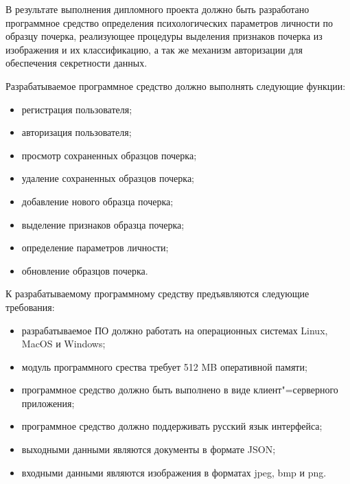 В результате выполнения дипломного проекта должно быть разработано программное средство определения психологических параметров личности по образцу почерка, реализующее процедуры выделения признаков почерка из изображения и их классификацию, а так же механизм авторизации для обеспечения секретности данных.

Разрабатываемое программное средство должно выполнять следующие функции:
\begin{itemize}
  \item регистрация пользователя;
  \item авторизация пользователя;
  \item просмотр сохраненных образцов почерка;
  \item удаление сохраненных образцов почерка;
  \item добавление нового образца почерка;
  \item выделение признаков образца почерка;
  \item определение параметров личности;
  \item обновление образцов почерка.
\end{itemize}

К разрабатываемому программному средству предъявляются следующие требования:
\begin{itemize}
  \item разрабатываемое ПО должно работать на операционных системах Linux, MacOS и Windows;
  \item модуль программного срества требует 512 MB оперативной памяти;
  \item программное средство должно быть выполнено в виде клиент"=серверного приложения;
  \item программное средство должно поддерживать русский язык \mbox{интерфейса;}
  \item выходными данными являются документы в формате JSON;
  \item входными данными являются изображения в форматах jpeg, bmp и png.
\end{itemize}  